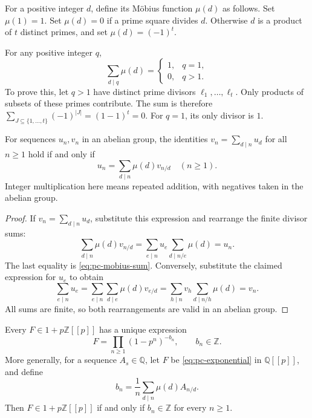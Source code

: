 For a positive integer $d$, define its M\"obius function $\mu(d)$ as follows.
Set $\mu(1)=1$. Set $\mu(d)=0$ if a prime square divides $d$.
Otherwise $d$ is a product of $t$ distinct primes, and set $\mu(d)=(-1)^t$.

For any positive integer $q$,
\begin{equation}
 \sum_{d\mid q}\mu(d)=
 \begin{cases}1,&q=1,\\0,&q>1.\end{cases}
 \label{eq:pc-mobius-sum}
\end{equation}
To prove this, let $q>1$ have distinct prime divisors $\ell_1,\ldots,\ell_t$.
Only products of subsets of these primes contribute.
The sum is therefore $\sum_{J\subseteq\{1,\ldots,t\}}(-1)^{|J|}
=(1-1)^t=0$. For $q=1$, its only divisor is $1$.

\begin{lemma}
\label{lem:pc-inversion}
For sequences $u_n,v_n$ in an abelian group, the identities
$v_n=\sum_{d\mid n}u_d$ for all $n\geq1$ hold if and only if
\[
 u_n=\sum_{d\mid n}\mu(d)v_{n/d}\quad(n\geq1).
\]
Integer multiplication here means repeated addition, with negatives taken
in the abelian group.
\end{lemma}

\begin{proof}
If $v_n=\sum_{d\mid n}u_d$, substitute this expression and rearrange the
finite divisor sums:
\[
 \sum_{d\mid n}\mu(d)v_{n/d}
   =\sum_{e\mid n}u_e\sum_{d\mid n/e}\mu(d)=u_n.
\]
The last equality is \eqref{eq:pc-mobius-sum}.
Conversely, substitute the claimed expression for $u_e$ to obtain
\[
 \sum_{e\mid n}u_e
   =\sum_{e\mid n}\sum_{d\mid e}\mu(d)v_{e/d}
   =\sum_{h\mid n}v_h\sum_{d\mid n/h}\mu(d)=v_n.
\]
All sums are finite, so both rearrangements are valid in an abelian group.
\end{proof}

\begin{theorem}
\label{thm:pc-integrality}
Every $F\in1+p\mathbb Z[[p]]$ has a unique expression
\[
 F=\prod_{n\geq1}(1-p^n)^{-b_n},\qquad b_n\in\mathbb Z.
\]
More generally, for a sequence $A_s\in\mathbb Q$, let $F$ be
\eqref{eq:pc-exponential} in $\mathbb Q[[p]]$, and define
\begin{equation}
 b_n=\frac1n\sum_{d\mid n}\mu(d)A_{n/d}.
 \label{eq:pc-integrality-criterion}
\end{equation}
Then $F\in1+p\mathbb Z[[p]]$ if and only if $b_n\in\mathbb Z$
for every $n\geq1$.
\end{theorem}

